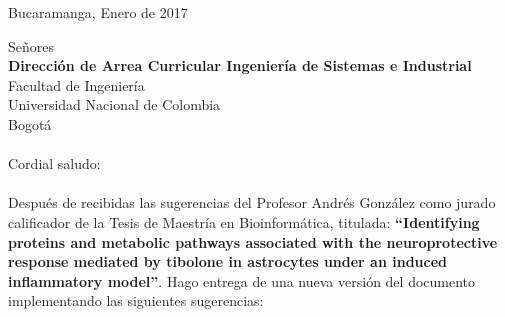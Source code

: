 \documentclass[11pt,a4paper]{article}
\begin{document}
\pagestyle{empty}
\begin{flushright}
Bucaramanga, Enero de 2017
\end{flushright}
Señores\\
\textbf{Dirección de Arrea Curricular Ingeniería de Sistemas e Industrial}\\
Facultad de Ingeniería\\
Universidad Nacional de Colombia\\
Bogotá\\
\\
Cordial saludo:\\
\\
Después de recibidas las sugerencias del Profesor Andrés González como jurado calificador de la Tesis de Maestría en Bioinformática, titulada: \textbf{“Identifying proteins and metabolic pathways associated with the neuroprotective response mediated by tibolone in astrocytes under an induced inflammatory model”}. Hago entrega de una nueva versión del documento implementando las siguientes sugerencias:
\end{document}
